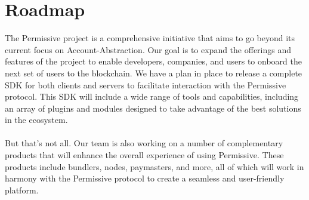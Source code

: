 \documentclass{article}
\begin{document}
\section{Roadmap}
The Permissive project is a comprehensive initiative that aims to go beyond its current focus on Account-Abstraction. Our goal is to expand the offerings and features of the project to enable developers, companies, and users to onboard the next set of users to the blockchain. We have a plan in place to release a complete SDK for both clients and servers to facilitate interaction with the Permissive protocol. This SDK will include a wide range of tools and capabilities, including an array of plugins and modules designed to take advantage of the best solutions in the ecosystem.
\paragraph{}
But that's not all. Our team is also working on a number of complementary products that will enhance the overall experience of using Permissive. These products include bundlers, nodes, paymasters, and more, all of which will work in harmony with the Permissive protocol to create a seamless and user-friendly platform.
\end{document}
